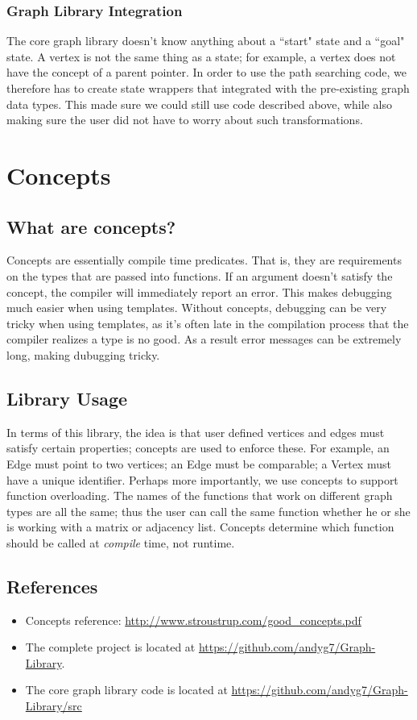 \documentclass{article}
\begin{document}
\subsubsection{Graph Library Integration}
The core graph library doesn't know anything about a ``start" state and a ``goal" state. A vertex is not the same thing as a state; for example, a vertex does not have the concept of a parent pointer. In order to use the path searching code, we therefore has to create state wrappers that integrated with the pre-existing graph data types. This made sure we could still use code described above, while also making sure the user did not have to worry about such transformations.

\section{Concepts}
\subsection{What are concepts?}
Concepts are essentially compile time predicates. That is, they are requirements on the types that are passed into functions. If an argument doesn't satisfy the concept, the compiler will immediately report an error. This makes debugging much easier when using templates. Without concepts, debugging can be very tricky when using templates, as it's often late in the compilation process that the compiler realizes a type is no good. As a result error messages can be extremely long, making dubugging tricky. 
\subsection{Library Usage}
In terms of this library, the idea is that user defined vertices and edges must satisfy certain properties; concepts are used to enforce these. For example, an Edge must point to two vertices; an Edge must be comparable; a Vertex must have a unique identifier. Perhaps more importantly, we use concepts to support function overloading. The names of the functions that work on different graph types are all the same; thus the user can call the same function whether he or she is working with a matrix or adjacency list. Concepts determine which function should be called at \emph{compile} time, not runtime. 

\subsection{References}
\begin{itemize}
\item Concepts reference: \url{http://www.stroustrup.com/good_concepts.pdf}
\item The complete project is located at \url{https://github.com/andyg7/Graph-Library}.
\item The core graph library code is located at \url{https://github.com/andyg7/Graph-Library/src}
\end{itemize}
\end{document}
